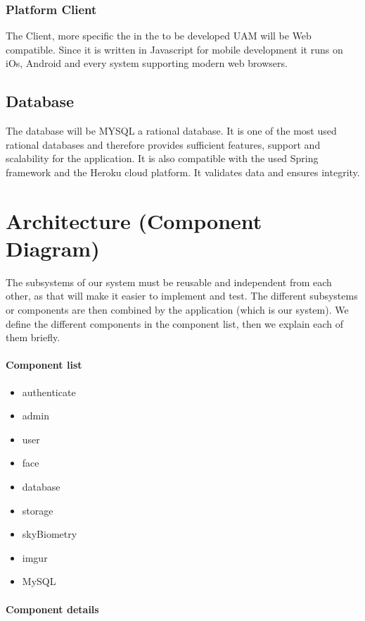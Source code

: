 \documentclass[a4paper,11pt]{article}
\begin{document}
\subsubsection{Platform Client}
The Client, more specific the in the to be developed UAM will be Web compatible. Since it is written in Javascript for mobile development it runs on iOs, Android and every system supporting modern web browsers.

\subsection{Database}
The database will be MYSQL a rational database.
It is one of the most used rational databases and therefore provides sufficient features, support and scalability for the application. It is also compatible with the used Spring framework and the Heroku cloud platform. It validates data and ensures integrity.




\section{Architecture (Component Diagram)} \label{Architecture}
The subsystems of our system must be reusable and independent from each
other, as that will make it easier to implement and test. The different
subsystems or components are then combined by the application (which is
our system). We define the different components in the component list,
then we explain each of them briefly.

\paragraph{Component list}\label{component-list}

\begin{itemize}
\item
  authenticate
\item
  admin
\item
  user
\item
  face
\item
  database
\item
  storage
\item
  skyBiometry
\item
  imgur
\item
  MySQL
\end{itemize}

\paragraph{Component details}\label{component-details}
\end{document}
